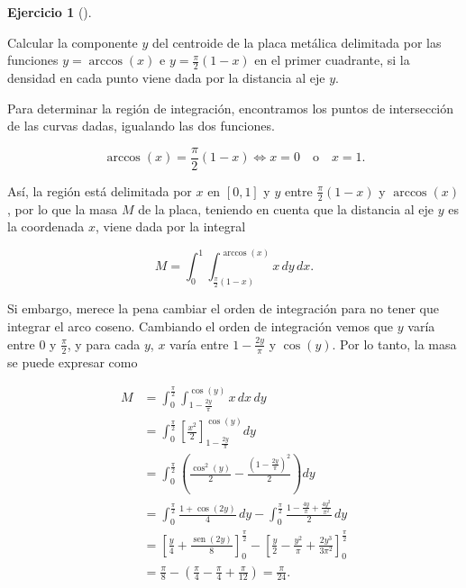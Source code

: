 \documentclass[
  spanish,
  a4paper,
]{scrreport}
\theoremstyle{definition}
\newtheorem{exercise}{Ejercicio}[chapter]
\theoremstyle{remark}
\begin{document}
\begin{exercise}[]\protect\hypertarget{exr-5}{}\label{exr-5}

Calcular la componente \(y\) del centroide de la placa metálica
delimitada por las funciones \(y=\operatorname{arccos}(x)\) e
\(y=\frac{\pi}{2}(1-x)\) en el primer cuadrante, si la densidad en cada
punto viene dada por la distancia al eje \(y\).

\end{exercise}

\begin{tcolorbox}[enhanced jigsaw, arc=.35mm, bottomrule=.15mm, bottomtitle=1mm, breakable, colback=white, colbacktitle=quarto-callout-tip-color!10!white, colframe=quarto-callout-tip-color-frame, coltitle=black, left=2mm, leftrule=.75mm, opacityback=0, opacitybacktitle=0.6, rightrule=.15mm, title=\textcolor{quarto-callout-tip-color}{\faLightbulb}\hspace{0.5em}{Solución}, titlerule=0mm, toprule=.15mm, toptitle=1mm]

Para determinar la región de integración, encontramos los puntos de
intersección de las curvas dadas, igualando las dos funciones.

\[
\operatorname{arccos}(x) = \frac{\pi}{2}(1-x)
\Leftrightarrow x = 0 \quad \text{o} \quad x = 1.
\]

Así, la región está delimitada por \(x\) en \([0,1]\) y \(y\) entre
\(\frac{\pi}{2}(1-x)\) y \(\operatorname{arccos}(x)\), por lo que la
masa \(M\) de la placa, teniendo en cuenta que la distancia al eje \(y\)
es la coordenada \(x\), viene dada por la integral

\[
M = \int_0^1 \int_{\frac{\pi}{2}(1-x)}^{\operatorname{arccos}(x)} x \, dy \, dx.
\]

Si embargo, merece la pena cambiar el orden de integración para no tener
que integrar el arco coseno. Cambiando el orden de integración vemos que
\(y\) varía entre \(0\) y \(\frac{\pi}{2}\), y para cada \(y\), \(x\)
varía entre \(1 - \frac{2y}{\pi}\) y \(\cos(y)\). Por lo tanto, la masa
se puede expresar como

\begin{align*}
M &= \int_0^{\frac{\pi}{2}} \int_{1 - \frac{2y}{\pi}}^{\cos(y)} x \, dx \, dy \\
&= \int_0^{\frac{\pi}{2}} \left[ \frac{x^2}{2} \right]_{1 - \frac{2y}{\pi}}^{\cos(y)} dy \\
&= \int_0^{\frac{\pi}{2}} \left( \frac{\cos^2(y)}{2} - \frac{(1 - \frac{2y}{\pi})^2}{2} \right) dy \\
&= \int_0^{\frac{\pi}{2}}  \frac{1 + \cos(2y)}{4}\,dy - \int_0^{\frac{\pi}{2}} \frac{1 - \frac{4y}{\pi} + \frac{4y^2}{\pi^2}}{2}\,dy \\
&= \left[ \frac{y}{4} + \frac{\operatorname{sen}(2y)}{8} \right]_0^{\frac{\pi}{2}} - \left[ \frac{y}{2} - \frac{y^2}{\pi} + \frac{2y^3}{3\pi^2} \right]_0^{\frac{\pi}{2}} \\
&= \frac{\pi}{8} - \left( \frac{\pi}{4} - \frac{\pi}{4} + \frac{\pi}{12} \right) = \frac{\pi}{24}.
\end{align*}


\end{tcolorbox}
\end{document}
